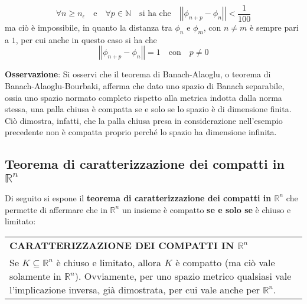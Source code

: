 \documentclass[a4paper]{extarticle}
\renewcommand\arraystretch{}
\begin{document}
\[\forall n \geq n_\epsilon \hspace{1em} \text{e} \hspace{1em} \forall p \in \mathbb{N} \hspace{1em} \text{si ha che} \hspace{1em} \left \vert \left \vert \phi_{n+p} - \phi_n \right \vert \right \vert < \frac{1}{100}\]
ma ciò è impossibile, in quanto la distanza tra $\phi_n$ e $\phi_m$, con $n \neq m$ è sempre pari a $1$, per cui anche in questo caso si ha che
\[\left \vert \left \vert \phi_{n+p} - \phi_n \right \vert \right \vert=1 \hspace{1em} \text{con} \hspace{1em} p \neq 0\]

\vspace{1em}
\noindent
\textbf{Osservazione}: Si osservi che il teorema di Banach-Alaoglu, o teorema di Banach-Alaoglu-Bourbaki, afferma che dato uno spazio di Banach separabile, ossia uno spazio normato completo rispetto alla metrica indotta dalla norma stessa, una palla chiusa è compatta se e solo se lo spazio è di dimensione finita.\\
Ciò dimostra, infatti, che la palla chiusa presa in considerazione nell'esempio precedente non è compatta proprio perché lo spazio ha dimensione infinita.

\vspace{1em}
\noindent
\subsection{Teorema di caratterizzazione dei compatti in $\mathbb{R}^n$}
Di seguito si espone il \textbf{teorema di caratterizzazione dei compatti in $\mathbb{R}^n$} che permette di affermare che in $\mathbb{R}^n$ un insieme è compatto \textbf{se e solo se} è chiuso e limitato:

\vspace{1em}
\setlength{\tabcolsep}{14pt}
\renewcommand{\arraystretch}{2}
\noindent
\begin{tabularx}{\textwidth}{@{}|P|@{}}
    \hline
    {\textbf{CARATTERIZZAZIONE DEI COMPATTI IN $\mathbb{R}^n$}}\\
    \parbox{\linewidth}{Se $K \subseteq \mathbb{R}^n$ è chiuso e limitato, allora $K$ è compatto (ma ciò vale solamente in $\mathbb{R}^n$). Ovviamente, per uno spazio metrico qualsiasi vale l'implicazione inversa, già dimostrata, per cui vale anche per $\mathbb{R}^n$.\vspace{3mm}}\\
    \hline
\end{tabularx}
\end{document}

